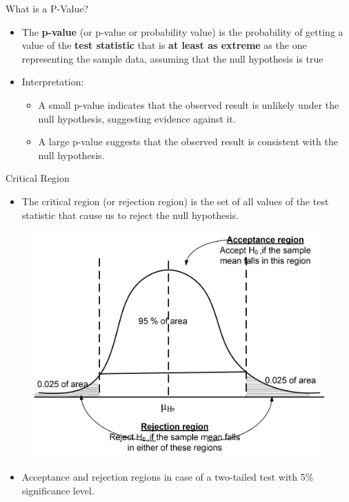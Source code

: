 \documentclass[
  ignorenonframetext,
]{beamer}
\providecommand{\tightlist}{%
  \setlength{\itemsep}{0pt}\setlength{\parskip}{0pt}}
\begin{document}
\begin{frame}{What is a P-Value?}
\label{what-is-a-p-value}
\begin{itemize}
\tightlist
\item
  The \textbf{p-value} (or p-value or probability value) is the
  probability of getting a value of the \textbf{test statistic} that is
  \textbf{at least as extreme} as the one representing the sample data,
  assuming that the null hypothesis is true
\end{itemize}

\begin{itemize}
\item
  Interpretation:

  \begin{itemize}
  \tightlist
  \item
    A small p-value indicates that the observed result is unlikely under
    the null hypothesis, suggesting evidence against it.\\
  \item
    A large p-value suggests that the observed result is consistent with
    the null hypothesis.
  \end{itemize}
\end{itemize}
\end{frame}

\begin{frame}{Critical Region}
\label{critical-region}
\begin{itemize}
\tightlist
\item
  The critical region (or rejection region) is the set of all values of
  the test statistic that cause us to reject the null hypothesis.
\end{itemize}

\begin{figure}

{\centering \includegraphics[width=0.4\linewidth]{figs/criticalregion} 

}

\end{figure}

\begin{itemize}
\tightlist
\item
  Acceptance and rejection regions in case of a two-tailed test with 5\%
  significance level.
\end{itemize}
\end{frame}
\end{document}
